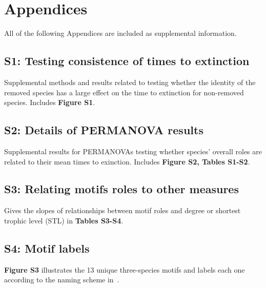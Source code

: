 \documentclass[12pt]{article}
\begin{document}
\clearpage

\section*{Appendices}

\begin{spacing}{2.0}

All of the following Appendices are included as supplemental information.

    \subsection*{S1: Testing consistence of times to extinction}
    
        Supplemental methods and results related to testing whether the identity of the removed species has a large effect on the time to extinction for non-removed species. Includes \textbf{Figure S1}.
    
    \subsection*{S2: Details of PERMANOVA results}
        
        Supplemental results for PERMANOVAs testing whether species' overall roles are related to their mean times to exinction. Includes \textbf{Figure S2, Tables S1-S2}.
    
    \subsection*{S3: Relating motifs roles to other measures}
        
        Gives the slopes of relationships between motif roles and degree or shortest trophic level (STL) in \textbf{Tables S3-S4}.
        
    \subsection*{S4: Motif labels}
        
        \textbf{Figure S3} illustrates the 13 unique three-species motifs and labels each one according to the naming scheme in~\citet{Stouffer2007}.

\end{spacing}
\end{document}
